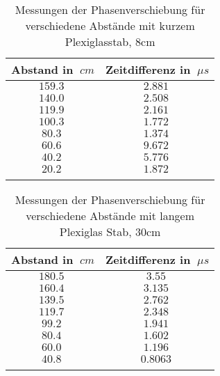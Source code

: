 \begin{table}[h!]
    \begin{center}
        \caption{Messungen der Phasenverschiebung für verschiedene Abstände mit kurzem Plexiglasstab, 8cm}
        \begin{tabular}{cc}
            \hline
            Abstand in $\SI{}{cm}$ & Zeitdifferenz in $\SI{}{\mu s}$ \\
            \hline
            $\SI{159,3}{}$    & $\SI{2,881}{}$ \\
            $\SI{140,0}{}$    & $\SI{2,508}{}$ \\
            $\SI{119,9}{}$    & $\SI{2,161}{}$ \\
            $\SI{100,3}{}$    & $\SI{1,772}{}$ \\
            $\SI{80,3}{}$     & $\SI{1,374}{}$ \\
            $\SI{60,6}{}$     & $\SI{9,672}{}$ \\
            $\SI{40,2}{}$     & $\SI{5,776}{}$ \\
            $\SI{20,2}{}$     & $\SI{1,872}{}$ \\
            \hline
            \label{tab:Messwerte-Zeitdiffernz-Abstand-Plexi-kurz}
        \end{tabular}
    \end{center}
\end{table}

\begin{table}[h!]
    \begin{center}
        \caption{Messungen der Phasenverschiebung für verschiedene Abstände mit langem Plexiglas Stab, 30cm}
        \begin{tabular}{cc}
            \hline
            Abstand in $\SI{}{cm}$ & Zeitdifferenz in $\SI{}{\mu s}$ \\
            \hline
            $\SI{180,5}{}$    & $\SI{3,55}{}$ \\
            $\SI{160,4}{}$    & $\SI{3,135}{}$ \\
            $\SI{139,5}{}$    & $\SI{2,762}{}$ \\
            $\SI{119,7}{}$    & $\SI{2,348}{}$ \\
            $\SI{99,2}{}$     & $\SI{1,941}{}$ \\
            $\SI{80,4}{}$     & $\SI{1,602}{}$ \\
            $\SI{60,0}{}$     & $\SI{1,196}{}$ \\
            $\SI{40,8}{}$     & $\SI{0,8063}{}$ \\
            \hline
            \label{tab:Messwerte-Zeitdiffernz-Abstand-Plexi-lang}
        \end{tabular}
    \end{center}
\end{table}

